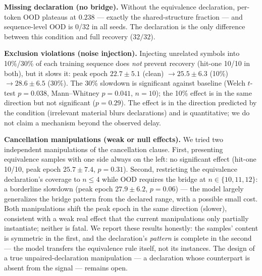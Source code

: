 \documentclass{article} %
\begin{document}
\textbf{Missing declaration (no bridge).} Without the equivalence
declaration, per-token OOD plateaus at $0.238$ --- exactly the
shared-structure fraction --- and sequence-level OOD is 0/32 in all
seeds. The declaration is the only difference between this
condition and full recovery ($32/32$).

\textbf{Exclusion violations (noise injection).} Injecting
unrelated symbols into 10\%/30\% of each training sequence does
\emph{not} prevent recovery (hit-one 10/10 in both), but it slows
it: peak epoch $22.7 \pm 5.1$ (clean) $\to 25.5 \pm 6.3$ (10\%) $\to
28.6 \pm 6.5$ (30\%). The 30\% slowdown is significant against
baseline (Welch $t$-test $p = 0.038$, Mann--Whitney $p = 0.041$,
$n = 10$); the 10\% effect is in the same direction but not
significant ($p = 0.29$). The effect is in the direction predicted
by the condition (irrelevant material blurs declarations) and is
quantitative; we do not claim a mechanism beyond the observed
delay.

\textbf{Cancellation manipulations (weak or null effects).} We
tried two independent manipulations of the cancellation clause.
First, presenting equivalence samples with one side always on the
left: no significant effect (hit-one 10/10, peak epoch $25.7 \pm
7.4$, $p = 0.31$). Second, restricting the equivalence
declaration's coverage to $n \le 4$ while OOD requires the bridge
at $n \in \{10,11,12\}$: a borderline slowdown (peak epoch $27.9
\pm 6.2$, $p = 0.06$) --- the model largely generalizes the bridge
pattern from the declared range, with a possible small cost. Both
manipulations shift the peak epoch in the same direction
(slower), consistent with a weak real effect that the current
manipulations only partially instantiate; neither is fatal. We
report these results honestly: the samples' content is symmetric
in the first, and the declaration's \emph{pattern} is complete in
the second --- the model transfers the equivalence rule itself,
not its instances. The design of a true unpaired-declaration
manipulation --- a declaration whose counterpart is absent from
the signal --- remains open.
\end{document}
